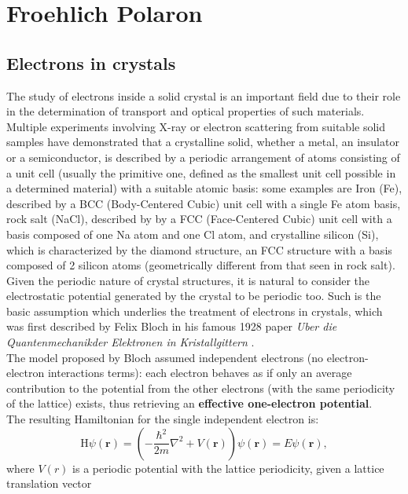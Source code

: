 \section{Froehlich Polaron}
\subsection{Electrons in crystals}
The study of electrons inside a solid crystal is an important field due to their role in the determination of transport
and optical properties of such materials.\\
Multiple experiments involving X-ray or electron scattering from suitable solid samples have demonstrated that a crystalline solid, 
whether a metal, an insulator or a semiconductor, is described by a periodic arrangement of atoms consisting of a unit cell 
(usually the primitive one, defined as the smallest unit cell possible in a determined material) with a suitable 
atomic basis: some examples are Iron (Fe), described by a BCC (Body-Centered Cubic) unit cell with a single Fe atom basis, 
rock salt (NaCl), described by by a FCC (Face-Centered Cubic) unit cell with a basis composed of one Na atom and one Cl atom, and 
crystalline silicon (Si), which is characterized by the diamond structure, an FCC structure with a basis composed of 2 silicon atoms 
(geometrically different from that seen in rock salt). \\
Given the periodic nature of crystal structures, it is natural to consider the electrostatic potential generated by the crystal to 
be periodic too. Such is the basic assumption which underlies the treatment of electrons in crystals, which was first described by 
Felix Bloch in his famous 1928 paper \textit{Uber die Quantenmechanikder Elektronen in Kristallgittern} \cite{bloch1928quantum}.\\
The model proposed by Bloch assumed independent electrons (no electron-electron interactions terms): each electron behaves as 
if only an average contribution to the potential from the other electrons (with the same periodicity of the lattice) exists, thus 
retrieving an \textbf{effective one-electron potential}.\\
The resulting Hamiltonian for the single independent electron is:
\begin{equation}
    \mathrm{H}\psi(\mathbf{r})=\left(-\frac{\hbar^2}{2m}\nabla^2+V(\mathbf{r})\right)\psi(\mathbf{r})=E\psi(\mathbf{r}),
    \label{eq_0_00}
\end{equation}
where $V(r)$ is a periodic potential with the lattice periodicity, given a lattice translation vector
